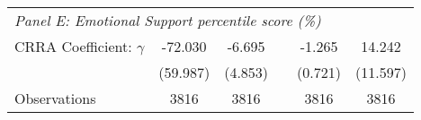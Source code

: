 {\begin{tabular}{l*{5}{c}}
\midrule

 \multicolumn{6}{l}{\textit{Panel E: Emotional Support percentile score (\%)}} \\
CRRA Coefficient: $\gamma$&  -72.030         &     -6.695  &           &   -1.265\sym{*}  &     14.242               \\
                & (59.987)         &       (4.853)          & &  (0.721)         &       (11.597)            \\
\addlinespace
Observations    &     3816         &     3816         & &    3816         &     3816         \\
\bottomrule
\end{tabular}
}
